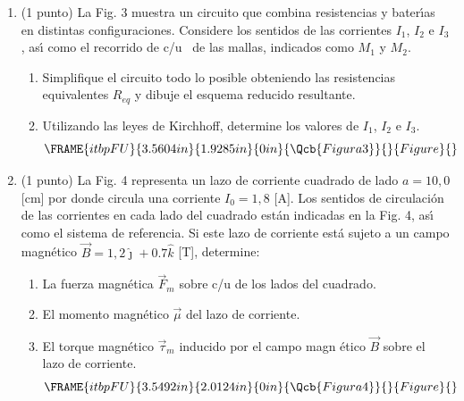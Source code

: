 \documentclass[onecolumn]{article}
\begin{document}
\begin{enumerate}
\item (1 punto) La Fig. 3 muestra un circuito que combina resistencias y
bater\'{\i}as en distintas configuraciones. Considere los sentidos de las
corrientes $I_{1}$, $I_{2}$ e $I_{3}$, as\'{\i} como el recorrido de c/u \
de las mallas, indicados como $M_{1}$ y $M_{2}$.

\begin{enumerate}
\item Simplifique el circuito todo lo posible obteniendo las resistencias
equivalentes $R_{eq}$ y dibuje el esquema reducido resultante.

\item Utilizando las leyes de Kirchhoff, determine los valores de $I_{1}$, $%
I_{2}$ e $I_{3}$.%
\begin{equation*}
\FRAME{itbpFU}{3.5604in}{1.9285in}{0in}{\Qcb{Figura 3}}{}{Figure}{\special%
{language "Scientific Word";type "GRAPHIC";maintain-aspect-ratio
TRUE;display "USEDEF";valid_file "T";width 3.5604in;height 1.9285in;depth
0in;original-width 7.3129in;original-height 3.9479in;cropleft "0";croptop
"1";cropright "1";cropbottom "0";tempfilename
'TGA9MA05.wmf';tempfile-properties "XPR";}}
\end{equation*}
\end{enumerate}

\item (1 punto) La Fig. 4 representa un lazo de corriente cuadrado de lado $%
a=10,0$ [cm] por donde circula una corriente $I_{0}=1,8$ [A]. Los sentidos
de circulaci\'{o}n de las corrientes en cada lado del cuadrado est\'{a}n
indicadas en la Fig. 4, as\'{\i} como el sistema de referencia. Si este lazo
de corriente est\'{a} sujeto a un campo magn\'{e}tico $\vec{B}=1,2\hat{\jmath%
}+0.7\hat{k}$ [T], determine:

\begin{enumerate}
\item La fuerza magn\'{e}tica $\vec{F}_{m}$ sobre c/u de los lados del
cuadrado.

\item El momento magn\'{e}tico $\vec{\mu}$ del lazo de corriente.

\item El torque magn\'{e}tico $\vec{\tau}_{m}$ inducido por el campo magn%
\'{e}tico $\vec{B}$ sobre el lazo de corriente. 
\begin{equation*}
\FRAME{itbpFU}{3.5492in}{2.0124in}{0in}{\Qcb{Figura 4}}{}{Figure}{\special%
{language "Scientific Word";type "GRAPHIC";maintain-aspect-ratio
TRUE;display "USEDEF";valid_file "T";width 3.5492in;height 2.0124in;depth
0in;original-width 6.0105in;original-height 3.3961in;cropleft "0";croptop
"1";cropright "1";cropbottom "0";tempfilename
'TGA9W707.wmf';tempfile-properties "XPR";}}
\end{equation*}
\end{enumerate}
\end{enumerate}
\end{document}
